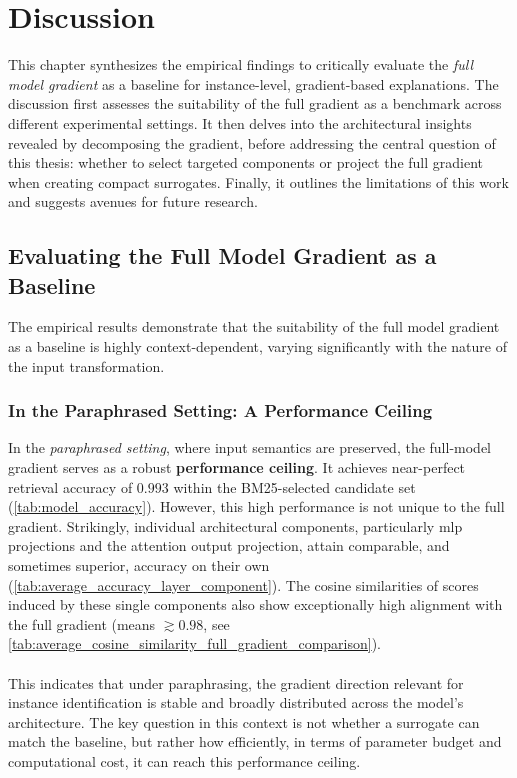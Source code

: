 \chapter{Discussion}\label{cha:discussion}
This chapter synthesizes the empirical findings to critically evaluate the \emph{full model gradient} as a baseline for instance-level, gradient-based explanations. The discussion first assesses the suitability of the full gradient as a benchmark across different experimental settings. It then delves into the architectural insights revealed by decomposing the gradient, before addressing the central question of this thesis: whether to select targeted components or project the full gradient when creating compact surrogates. Finally, it outlines the limitations of this work and suggests avenues for future research.

\section{Evaluating the Full Model Gradient as a Baseline}
The empirical results demonstrate that the suitability of the full model gradient as a baseline is highly context-dependent, varying significantly with the nature of the input transformation.

\subsection{In the Paraphrased Setting: A Performance Ceiling}
In the \emph{paraphrased setting}, where input semantics are preserved, the full-model gradient serves as a robust \textbf{performance ceiling}. It achieves near-perfect retrieval accuracy of $0.993$ within the BM25-selected candidate set (\autoref{tab:model_accuracy}). However, this high performance is not unique to the full gradient. Strikingly, individual architectural components, particularly \acrshort{mlp} projections and the attention output projection, attain comparable, and sometimes superior, accuracy on their own (\autoref{tab:average_accuracy_layer_component}). The cosine similarities of scores induced by these single components also show exceptionally high alignment with the full gradient (means $\gtrsim 0.98$, see \autoref{tab:average_cosine_similarity_full_gradient_comparison}).
\\\\
This indicates that under paraphrasing, the gradient direction relevant for instance identification is stable and broadly distributed across the model's architecture. The key question in this context is not whether a surrogate can match the baseline, but rather how efficiently, in terms of parameter budget and computational cost, it can reach this performance ceiling.

